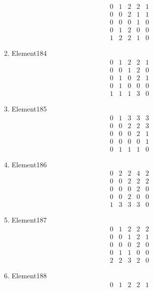 \documentclass[12pt]{article}
\begin{document}
\begin{multicols}{3}
\begin{enumerate}
\begin{equation*}
\begin{array}{ccccc}
0&1&2&2&1\\
0&0&2&1&1\\
0&0&0&1&0\\
0&1&2&0&0\\
1&2&2&1&0
\end{array}
\end{equation*}
\item Element184
\begin{equation*}
\begin{array}{ccccc}
0&1&2&2&1\\
0&0&1&2&0\\
0&1&0&2&1\\
0&1&0&0&0\\
1&1&1&3&0
\end{array}
\end{equation*}
\item Element185
\begin{equation*}
\begin{array}{ccccc}
0&1&3&3&3\\
0&0&2&2&3\\
0&0&0&2&1\\
0&0&0&0&1\\
0&1&1&1&0
\end{array}
\end{equation*}
\item Element186
\begin{equation*}
\begin{array}{ccccc}
0&2&2&4&2\\
0&0&2&2&2\\
0&0&0&2&0\\
0&0&2&0&0\\
1&3&3&3&0
\end{array}
\end{equation*}
\item Element187
\begin{equation*}
\begin{array}{ccccc}
0&1&2&2&2\\
0&0&1&2&1\\
0&0&0&2&0\\
0&1&1&0&0\\
2&2&3&2&0
\end{array}
\end{equation*}
\item Element188
\begin{equation*}
\begin{array}{ccccc}
0&1&2&2&1\\

\end{array}
\end{equation*}
\end{enumerate}
\end{multicols}
\end{document}
